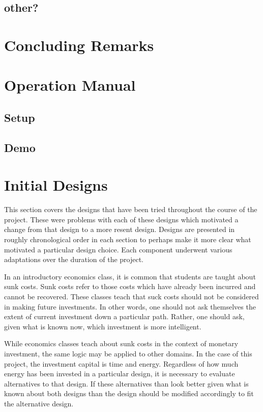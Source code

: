 \documentclass{article}	%
\begin{document}
\begin{multicols}{2}
\subsection{other?}

\section{Concluding Remarks}

\pagebreak
\appendix

\section{Operation Manual}

\subsection{Setup}

\subsection{Demo}

\newpage
\section{Initial Designs}
This section covers the designs that have been tried
throughout the course of the project. 
These were problems with each of these designs
which motivated a change from that design to
a more resent design.
Designs are presented in roughly chronological order in each section
to perhaps make it more clear what motivated
a particular design choice.
Each component underwent various adaptations 
over the duration of the project.

In an introductory economics class,
it is common that students are taught about sunk costs.
Sunk costs refer to those costs which
have already been incurred and
cannot be recovered.
These classes teach that suck costs should not
be considered in making future investments.
In other words,
one should not ask themselves the extent of 
current investment down a particular path.
Rather, one should ask,
given what is known now,
which investment is more intelligent.

While economics classes teach about sunk costs in
the context of monetary investment,
the same logic may be applied to other domains.
In the case of this project,
the investment capital is time and energy.
Regardless of how much energy has been invested
in a particular design,
it is necessary to evaluate alternatives to that design.
If these alternatives than look better
given what is known about both designs
than the design should be modified accordingly
to fit the alternative design.


\end{multicols}
\end{document}

